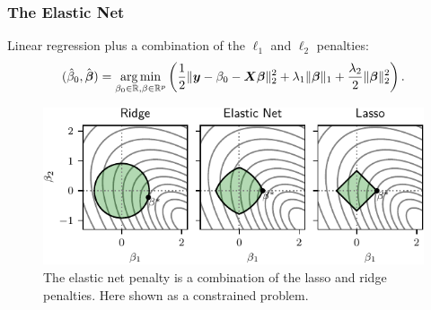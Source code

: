 \documentclass[10pt]{beamer}
\begin{document}
\begin{frame}[c]
  \frametitle{The Elastic Net}

  Linear regression plus a combination of the \(\ell_1\) and \(\ell_2\) penalties:
  \begin{equation*}
    (\hat{\beta}_0, \hat{\boldsymbol{\beta}}) = \operatorname*{arg\,min}_{\beta_0 \in \mathbb{R},\beta \in \mathbb{R}^p} \left( \frac{1}{2} \lVert \boldsymbol y - \beta_0 - \boldsymbol{X}\boldsymbol{\beta} \rVert^2_2  + \lambda_1 \lVert \boldsymbol\beta \rVert_1 + \frac{\lambda_2}{2}\lVert \boldsymbol \beta \rVert_2^2\right).
  \end{equation*}

  \pause

  \begin{figure}
    \centering
    \includegraphics[]{figures/elasticnet-balls.pdf}
    \caption{%
      The elastic net penalty is a combination of the lasso and ridge penalties. Here shown as a constrained problem.
    }
  \end{figure}

\end{frame}
\end{document}
